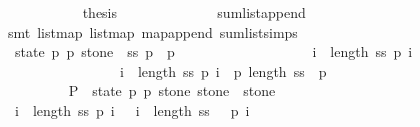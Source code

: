 \begin{isabellebody}
\ \ \ \ \ \ \ \ \ \ \isamarkupfalse%
\ {\isacharquery}thesis\isanewline
\ \ \ \ \ \ \ \ \ \ \ \ \isamarkupfalse%
\ sum{\isacharunderscore}list{\isacharunderscore}append\isanewline
\ \ \ \ \ \ \ \ \ \ \ \ \isamarkupfalse%
\ {\isacharparenleft}smt\ list{\isachardot}map{\isacharparenleft}{}{\isacharparenright}\ list{\isachardot}map{\isacharparenleft}{}{\isacharparenright}\ map{\isacharunderscore}append\ sum{\isacharunderscore}list{\isacharunderscore}simps{\isacharparenleft}{}{\isacharparenright}{\isacharparenright}\isanewline
\ \ \ \ \ \ \ \ \isamarkupfalse%
\isanewline
\ \ \ \ \ \ \ \ \isamarkupfalse%
\ \isanewline
\ \ \ \ \ \ \ \ \isamarkupfalse%
\ {\isachardoublequoteopen}{\isacharparenleft}{\isasymSum}\ {\isacharparenleft}state{\isacharcomma}\ p{}{\isacharcomma}\ p{}{\isacharcomma}\ stone{\isacharparenright}\ {\isasymleftarrow}\ ss{\isachardot}\ p{}\ {\isacharminus}\ p{}{\isacharparenright}\ {\isacharequal}\ \isanewline
\ \ \ \ \ \ \ \ \ \ \ \ \ \ \ \ {\isacharparenleft}{\isasymSum}\ i\ {\isasymleftarrow}\ {\isacharbrackleft}{}{\isachardot}{\isachardot}{\isacharless}length\ ss{\isacharminus}{}{\isacharbrackright}{\isachardot}\ {\isacharquery}p{}\ i{\isacharparenright}\ {\isacharminus}\isanewline
\ \ \ \ \ \ \ \ \ \ \ \ \ \ \ \ {\isacharparenleft}{\isasymSum}\ i\ {\isasymleftarrow}\ {\isacharbrackleft}{}{\isachardot}{\isachardot}{\isacharless}length\ ss{\isacharbrackright}{\isachardot}\ {\isacharquery}p{}\ i{\isacharparenright}\ {\isacharplus}\ {\isacharparenleft}{\isacharquery}p{}\ {\isacharparenleft}length\ ss{\isacharminus}{}{\isacharparenright}{\isacharparenright}\ {\isacharminus}\ {\isacharparenleft}{\isacharquery}p{}\ {}{\isacharparenright}{\isachardoublequoteclose}\isanewline
\ \ \ \ \ \ \ \ \ \ \isacommand{{\isachardot}}\isamarkupfalse%
\isanewline
\ \ \ \ \ \ \ \ \isamarkupfalse%
\isanewline
\isanewline
\ \ \ \ \ \ \ \ \isamarkupfalse%
\ {\isacharquery}P\ {\isacharequal}\ {\isachardoublequoteopen}{\isasymlambda}{\isacharparenleft}state{\isacharcomma}\ p{}{\isacharcomma}\ p{}{\isacharcomma}\ stone{\isacharprime}{\isacharparenright}{\isachardot}\ stone{\isacharprime}\ {\isacharequal}\ stone{\isachardoublequoteclose}\isanewline
\isanewline
\ \ \ \ \ \ \ \ \isamarkupfalse%
\ {\isachardoublequoteopen}{\isacharparenleft}{\isasymSum}\ i\ {\isasymleftarrow}\ {\isacharbrackleft}{}{\isachardot}{\isachardot}{\isacharless}length\ ss{\isacharbrackright}{\isachardot}\ {\isacharquery}p{}\ i{\isacharparenright}\ {\isacharequal}\ {\isacharparenleft}{\isasymSum}\ i\ {\isasymleftarrow}\ {\isacharbrackleft}{}{\isachardot}{\isachardot}{\isacharless}length\ ss\ {\isacharminus}\ {}{\isacharbrackright}{\isachardot}\ {\isacharquery}p{}\ i{\isacharparenright}{\isachardoublequoteclose}\isanewline

\end{isabellebody}
